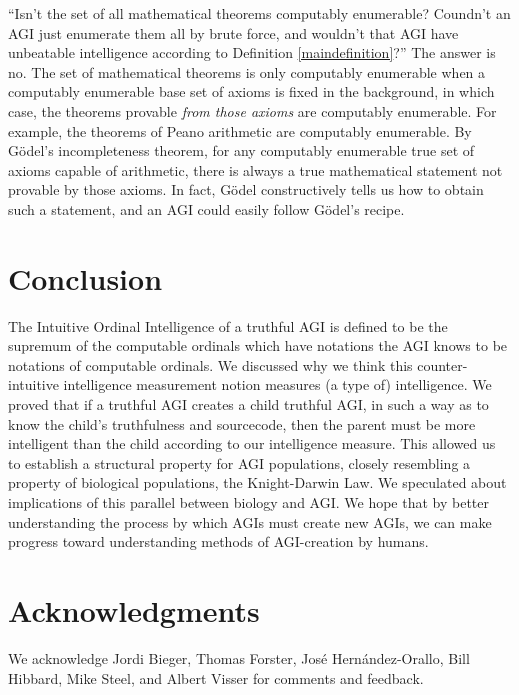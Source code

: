 \documentclass[runningheads]{llncs}
\begin{document}
``Isn't the set of all mathematical theorems computably enumerable?
Coundn't an AGI just enumerate them all by brute force, and wouldn't that AGI have
unbeatable intelligence according to Definition \ref{maindefinition}?'' The answer is no.
The set of mathematical theorems is only computably enumerable when a computably
enumerable base set of axioms is fixed in the background, in which case,
the theorems provable \emph{from those axioms} are computably enumerable.
For example, the
theorems of Peano arithmetic are computably enumerable.
By G\"odel's incompleteness theorem, for any computably
enumerable true set of axioms capable of arithmetic, there is always a
true mathematical statement not provable by
those axioms. In fact, G\"odel constructively tells us how to obtain such a
statement, and an AGI could easily follow G\"odel's recipe.

\section{Conclusion}
\label{conclusionsection}

The Intuitive Ordinal Intelligence of a truthful AGI is defined to be the supremum of the
computable ordinals which have notations the AGI knows to be notations of
computable ordinals. We discussed why we think this counter-intuitive intelligence
measurement notion measures (a type of) intelligence.
We proved that if a truthful AGI creates
a child truthful AGI, in such a way as to know the child's truthfulness and sourcecode,
then the parent must be more intelligent than the child according
to our intelligence measure. This allowed us to establish a structural
property for AGI populations,
closely resembling a property of biological populations, the Knight-Darwin
Law. We speculated about implications of this parallel between biology and
AGI.
We hope that by better understanding
the process by which AGIs must create new AGIs, we can make progress toward
understanding methods of AGI-creation by humans.

\section*{Acknowledgments}

We acknowledge Jordi Bieger, Thomas Forster, Jos{\'e} Hern{\'a}ndez-Orallo,
Bill Hibbard, Mike Steel,
and Albert Visser for comments and feedback.



\end{document}
